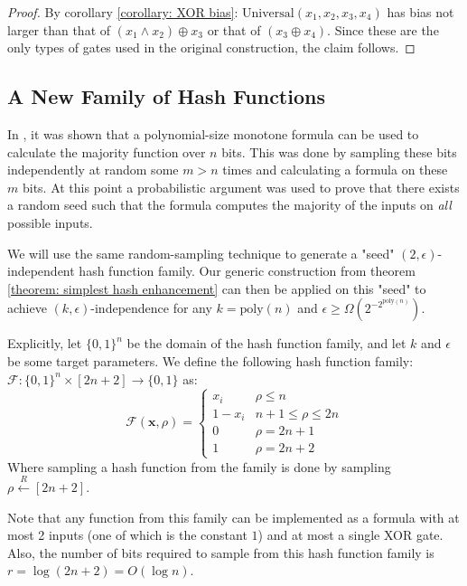 \documentclass[12pt]{article}
\newcommand{\Poly}[1]{\mathrm{poly}\left(#1\right)}
\newcommand{\zo}[1]{\{0,1\}^{#1}}
\newcommand{\F}{\mathcal{F}}
\renewcommand{\vec}[1]{\bm{#1}}
\begin{document}
	\begin{proof}
		By corollary \ref{corollary: XOR bias}: $\mathrm{Universal}(x_1, x_2, x_3, x_4)$ has bias not larger than that of $(x_1 \wedge x_2) \oplus x_3$ or that of $(x_3 \oplus x_4)$.
		Since these are the only types of gates used in the original construction, the claim follows.
	\end{proof}
	
	\subsection{A New Family of Hash Functions} \label{section: Simple circuit construction}
		
	In \cite{Valiant}, it was shown that a polynomial-size monotone formula can be used to calculate the majority function over $n$ bits.
	This was done by sampling these bits independently at random some $m>n$ times and calculating a formula on these $m$ bits.
	At this point a probabilistic argument was used to prove that there exists a random seed such that the formula computes the majority of the inputs on \emph{all} possible inputs.
	
	We will use the same random-sampling technique to generate a "seed" $(2, \epsilon)$-independent hash function family.
	Our generic construction from theorem \ref{theorem: simplest hash enhancement} can then be applied on this "seed" to achieve $(k, \epsilon)$-independence for any $k = \Poly{n}$ and $\epsilon \geq \Omega(2^{-2^{\Poly{n}}})$.
	
	Explicitly, let $\zo{n}$ be the domain of the hash function family, and let $k$ and $\epsilon$ be some target parameters.
	We define the following hash function family: 
		$\F : \zo{n} \times \left[2n+2\right] \rightarrow \{0,1\}$ as:
	\begin{equation*}
		\F(\vec{x}, \rho) =
		\begin{cases}
			x_i & \rho \leq n \\
			1-x_i & n + 1 \leq \rho \leq 2n \\
			0 & \rho = 2n+1 \\
			1 & \rho = 2n+2
		\end{cases}
	\end{equation*}
	Where sampling a hash function from the family is done by sampling
		$\rho \overset{R}{\leftarrow} \left[2n + 2\right]$.
	
	Note that any function from this family can be implemented as a formula with at most 2 inputs (one of which is the constant $1$) and at most a single XOR gate.
	Also, the number of bits required to sample from this hash function family is $r = \log(2n+2) = O(\log n)$.
	
\end{document}

